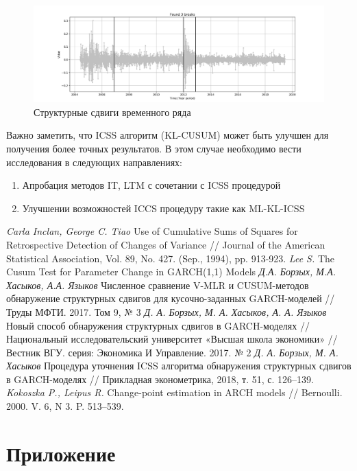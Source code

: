 \documentclass[a4paper,14pt,russian]{extarticle}
\begin{document}
	\begin{figure}[H]
		\includegraphics[width=\linewidth]{ru_stock_simulation_LKOH.png}
		\caption{\label{fig:fig3} Структурные сдвиги временного ряда}
	\end{figure}
	Важно заметить, что ICSS алгоритм (KL-CUSUM) может быть улучшен для получения более точных результатов. В этом случае необходимо вести исследования в следующих направлениях:
	\begin{enumerate}
		\item Апробация методов IT, LTM с сочетании с ICSS процедурой
		\item Улучшении возможностей ICCS процедуру такие как ML-KL-ICSS
	\end{enumerate}
	\clearpage
	\begin{thebibliography}{20}
		\label{sec:sec4}
		 \emph{Carla Inclan, George C. Tiao} Use of Cumulative Sums of Squares for Retrospective Detection of Changes of
			Variance // Journal of the American Statistical Association, Vol. 89, No. 427. (Sep., 1994), pp. 913-923.
		 \emph{Lee S. } The Cusum Test for Parameter Change in GARCH(1,1) Models
		 \emph{Д.А. Борзых, М.А. Хасыков, А.А. Языков} Численное сравнение V-MLR и CUSUM-методов обнаружение структурных сдвигов для кусочно-заданных GARCH-моделей // Труды МФТИ. 2017. Том 9, № 3
		 \emph{Д. А. Борзых, М. А. Хасыков, А. А. Языков} Новый способ обнаружения структурных сдвигов в GARCH-моделях // Национальный исследовательский университет «Высшая школа экономики» // Вестник ВГУ. серия: Экономика И Управление. 2017. № 2
		 \emph{Д. А. Борзых, М. А. Хасыков} Процедура уточнения ICSS алгоритма обнаружения структурных сдвигов в GARCH-моделях // Прикладная эконометрика, 2018, т. 51, с. 126–139.
		 \emph{Kokoszka P., Leipus R.} Change-point estimation in ARCH models  // Bernoulli. 2000. V. 6,
		N 3. P. 513–539.
	\end{thebibliography}
	
	\clearpage
	\section*{Приложение}
	
\end{document}
